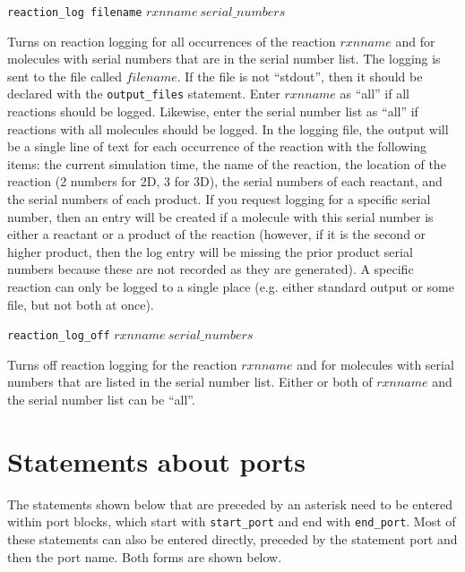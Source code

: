 \documentclass {scrbook}
\newcommand {\ttt} {\texttt}
\begin{document}
\begin{description}
\item{\ttt{reaction\_log filename} $rxnname\ serial\_numbers$}

Turns on reaction logging for all occurrences of the reaction $rxnname$ and for molecules with serial numbers that are in the serial number list. The logging is sent to the file called $filename$. If the file is not ``stdout'', then it should be declared with the \ttt{output\_files} statement. Enter $rxnname$ as ``all'' if all reactions should be logged. Likewise, enter the serial number list as ``all'' if reactions with all molecules should be logged. In the logging file, the output will be a single line of text for each occurrence of the reaction with the following items: the current simulation time, the name of the reaction, the location of the reaction (2 numbers for 2D, 3 for 3D), the serial numbers of each reactant, and the serial numbers of each product. If you request logging for a specific serial number, then an entry will be created if a molecule with this serial number is either a reactant or a product of the reaction (however, if it is the second or higher product, then the log entry will be missing the prior product serial numbers because these are not recorded as they are generated). A specific reaction can only be logged to a single place (e.g. either standard output or some file, but not both at once).

\item{\ttt{reaction\_log\_off} $rxnname\ serial\_numbers$}

Turns off reaction logging for the reaction $rxnname$ and for molecules with serial numbers that are listed in the serial number list. Either or both of $rxnname$ and the serial number list can be ``all''.

\end{description}

\section{Statements about ports}

The statements shown below that are preceded by an asterisk need to be entered within port blocks, which start with \ttt{start\_port} and end with \ttt{end\_port}. Most of these statements can also be entered directly, preceded by the statement port and then the port name. Both forms are shown below.
\end{document}
